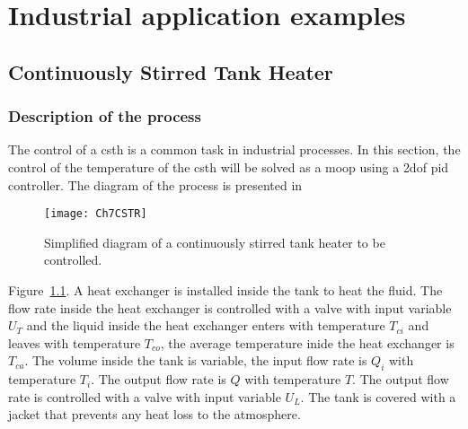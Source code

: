 \chapter{Industrial application examples}
\label{chap:ApplicationExamples}
%
%

%
\section{Continuously Stirred Tank Heater}
\label{sec:CSTH}
%
\subsection{Description of the process}
\label{sec:DescriptionCSTH}
%
The control of a \gls{csth} is a common task in industrial processes. In this section, the control of the temperature of the \gls{csth} will be solved as a \gls{moop} using a \gls{2dof} \gls{pid} controller. The diagram of the process is presented in %
\begin{figure}[bt]
	\centering
	\texttt{[image: Ch7CSTR]}
	\caption{Simplified diagram of a continuously stirred tank heater to be controlled.}
	\label{fig:Ch7CSTR}
\end{figure}
Figure~\ref{fig:Ch7CSTR}. A heat exchanger is installed inside the tank to heat the fluid. The flow rate inside the heat exchanger is controlled with a valve with input variable $U_T$ and the liquid inside the heat exchanger enters with temperature $T_{ci}$ and leaves with temperature $T_{co}$, the average temperature inide the heat exchanger is $T_{ca}$. The volume inside the tank is variable, the input flow rate is $Q_i$ with temperature $T_i$. The output flow rate is $Q$ with temperature $T$. The output flow rate is controlled with a valve with input variable $U_L$. The tank is covered with a jacket that prevents any heat loss to the atmosphere.

